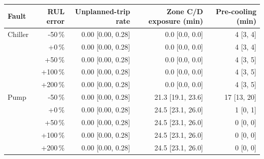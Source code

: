 \begin{tabular}{lrrrr}
\toprule
Fault & RUL error & Unplanned-trip rate & Zone C/D exposure (min) & Pre-cooling (min)\\
\midrule
Chiller & -50\,\% & 0.00 {\scriptsize[0.00, 0.28]} & 0.0 {\scriptsize[0.0, 0.0]} & 4 {\scriptsize[3, 4]}\\
 & +0\,\% & 0.00 {\scriptsize[0.00, 0.28]} & 0.0 {\scriptsize[0.0, 0.0]} & 4 {\scriptsize[3, 4]}\\
 & +50\,\% & 0.00 {\scriptsize[0.00, 0.28]} & 0.0 {\scriptsize[0.0, 0.0]} & 4 {\scriptsize[3, 5]}\\
 & +100\,\% & 0.00 {\scriptsize[0.00, 0.28]} & 0.0 {\scriptsize[0.0, 0.0]} & 4 {\scriptsize[3, 5]}\\
 & +200\,\% & 0.00 {\scriptsize[0.00, 0.28]} & 0.0 {\scriptsize[0.0, 0.0]} & 4 {\scriptsize[3, 5]}\\
\midrule
Pump & -50\,\% & 0.00 {\scriptsize[0.00, 0.28]} & 21.3 {\scriptsize[19.1, 23.6]} & 17 {\scriptsize[13, 20]}\\
 & +0\,\% & 0.00 {\scriptsize[0.00, 0.28]} & 24.5 {\scriptsize[23.1, 26.0]} & 1 {\scriptsize[0, 1]}\\
 & +50\,\% & 0.00 {\scriptsize[0.00, 0.28]} & 24.5 {\scriptsize[23.1, 26.0]} & 0 {\scriptsize[0, 0]}\\
 & +100\,\% & 0.00 {\scriptsize[0.00, 0.28]} & 24.5 {\scriptsize[23.1, 26.0]} & 0 {\scriptsize[0, 0]}\\
 & +200\,\% & 0.00 {\scriptsize[0.00, 0.28]} & 24.5 {\scriptsize[23.1, 26.0]} & 0 {\scriptsize[0, 0]}\\
\bottomrule
\end{tabular}
